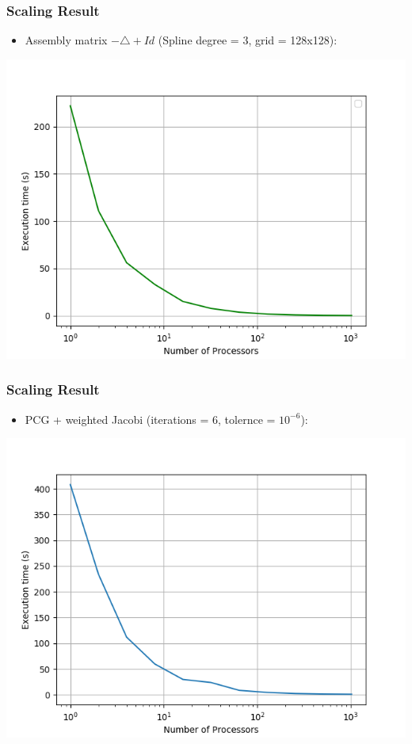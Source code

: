 \begin{frame}
\frametitle{Scaling	Result}
\begin{itemize}
\item Assembly matrix $-\triangle + Id$ (Spline degree = 3, grid = 128x128):
\end{itemize}
  \begin{center}
    \includegraphics[angle=0,width=0.9\hsize]{figures/ass}
  \end{center}
\end{frame}

\begin{frame}
\frametitle{Scaling	Result}
\begin{itemize}
\item PCG + weighted Jacobi (iterations = $6$, tolernce = $10^{-6}$):
\end{itemize}
  \begin{center}
    \includegraphics[angle=0,width=0.9\hsize]{figures/pres}
  \end{center}
\end{frame}

